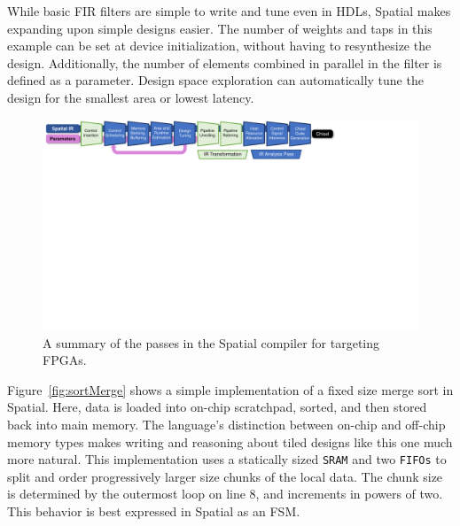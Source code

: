 While basic FIR filters are simple to write and tune even in HDLs, Spatial makes expanding upon simple designs easier. The number of weights and taps in this example can be set at device initialization, without having to resynthesize the design. Additionally, the number of elements combined in parallel in the filter is defined as a parameter. Design space exploration can automatically tune the design for the smallest area or lowest latency.


\begin{figure}
\centering
\includegraphics[clip, trim=0.3cm 15.4cm 7.7cm 0.0cm, width=\linewidth]{figs/compiler_flow.pdf}
\caption{A summary of the passes in the Spatial compiler for targeting FPGAs.}
\label{fig:compilerflow}
\end{figure}


Figure~\ref{fig:sortMerge} shows a simple implementation of a fixed size merge sort in Spatial. Here, data is loaded into on-chip scratchpad, sorted, and then stored back into main memory. 
The language's distinction between on-chip and off-chip memory types makes writing and reasoning about tiled designs like this one much more natural.
This implementation uses a statically sized \texttt{\small{SRAM}} and two \texttt{\small{FIFOs}} to split and order progressively larger size chunks of the local data. 
The chunk size is determined by the outermost loop on line 8, and increments in powers of two. This behavior is best expressed in Spatial as an FSM. 




